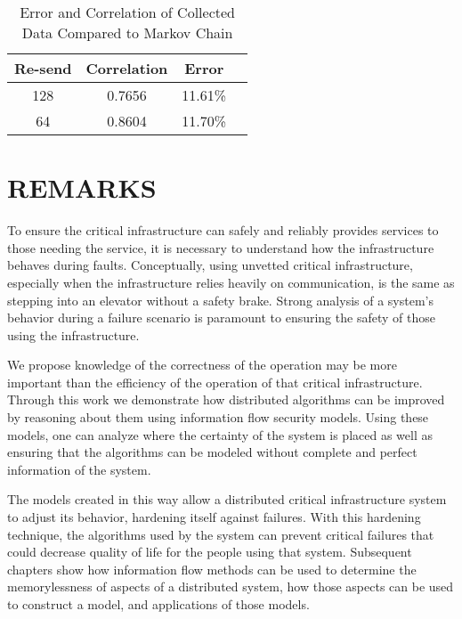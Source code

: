 \begin{table}
\caption{Error and Correlation of Collected Data Compared to Markov Chain}
\label{tab:STAT-DATA}
\centering
\begin{tabular}{|c||c|c|c|}
\hline
Re-send & Correlation & Error \\ \hline
128 & 0.7656 & 11.61\% \\ \hline
64 & 0.8604 & 11.70\% \\ \hline
\end{tabular}
\end{table}
\section{REMARKS}

To ensure the critical infrastructure can safely and reliably provides services to those needing the service, it is necessary to understand how the infrastructure behaves during faults.
Conceptually, using unvetted critical infrastructure, especially when the infrastructure relies heavily on communication, is the same as stepping into an elevator without a safety brake.
Strong analysis of a system's behavior during a failure scenario is paramount to ensuring the safety of those using the infrastructure.

We propose knowledge of the correctness of the operation may be more important than the efficiency of the operation of that critical infrastructure.
Through this work we demonstrate how distributed algorithms can be improved by reasoning about them using information flow security models.
Using these models, one can analyze where the certainty of the system is placed as well as ensuring that the algorithms can be modeled without complete and perfect information of the system.

The models created in this way allow a distributed critical infrastructure system to adjust its behavior, hardening itself against failures.
With this hardening technique, the algorithms used by the system can prevent critical failures that could decrease quality of life for the people using that system.
Subsequent chapters show how information flow methods can be used to determine the memorylessness of aspects of a distributed system, how those aspects can be used to construct a model, and applications of those models.
